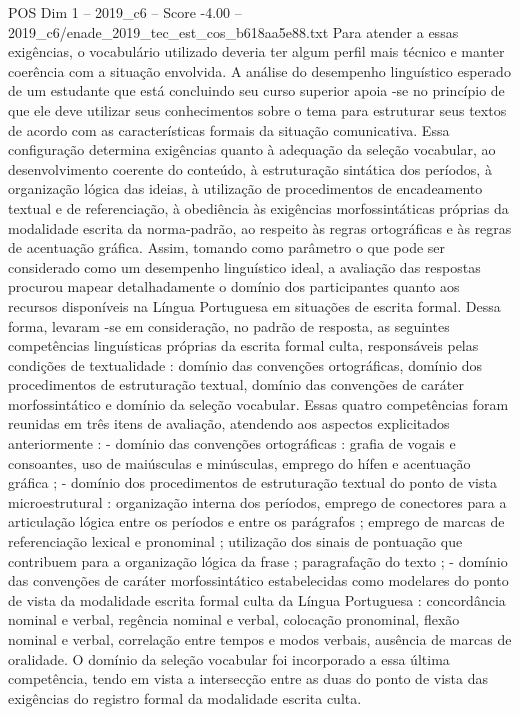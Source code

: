 \begin{textsample}{POS Dim 1 – 2019\_c6 – Score -4.00 – 2019\_c6/enade\_2019\_tec\_est\_cos\_b618aa5e88.txt}
Para atender a essas exigências, o vocabulário utilizado deveria ter algum perfil mais técnico e manter coerência com a situação envolvida.
A análise do desempenho linguístico esperado de um estudante que está concluindo seu curso superior apoia -se no princípio de que ele deve utilizar seus conhecimentos sobre o tema para estruturar seus textos de acordo com as características formais da situação comunicativa.
Essa configuração determina exigências quanto à adequação da seleção vocabular, ao desenvolvimento coerente do conteúdo, à estruturação sintática dos períodos, à organização lógica das ideias, à utilização de procedimentos de encadeamento textual e de referenciação, à obediência às exigências morfossintáticas próprias da modalidade escrita da norma-padrão, ao respeito às regras ortográficas e às regras de acentuação gráfica.
Assim, tomando como parâmetro o que pode ser considerado como um desempenho linguístico ideal, a avaliação das respostas procurou mapear detalhadamente o domínio dos participantes quanto aos recursos disponíveis na Língua Portuguesa em situações de escrita formal.
Dessa forma, levaram -se em consideração, no padrão de resposta, as seguintes competências linguísticas próprias da escrita formal culta, responsáveis pelas condições de textualidade : domínio das convenções ortográficas, domínio dos procedimentos de estruturação textual, domínio das convenções de caráter morfossintático e domínio da seleção vocabular.
Essas quatro competências foram reunidas em três itens de avaliação, atendendo aos aspectos explicitados anteriormente : - domínio das convenções ortográficas : grafia de vogais e consoantes, uso de maiúsculas e minúsculas, emprego do hífen e acentuação gráfica ; - domínio dos procedimentos de estruturação textual do ponto de vista microestrutural : organização interna dos períodos, emprego de conectores para a articulação lógica entre os períodos e entre os parágrafos ; emprego de marcas de referenciação lexical e pronominal ; utilização dos sinais de pontuação que contribuem para a organização lógica da frase ; paragrafação do texto ; - domínio das convenções de caráter morfossintático estabelecidas como modelares do ponto de vista da modalidade escrita formal culta da Língua Portuguesa : concordância nominal e verbal, regência nominal e verbal, colocação pronominal, flexão nominal e verbal, correlação entre tempos e modos verbais, ausência de marcas de oralidade.
O domínio da seleção vocabular foi incorporado a essa última competência, tendo em vista a intersecção entre as duas do ponto de vista das exigências do registro formal da modalidade escrita culta.

\end{textsample}
